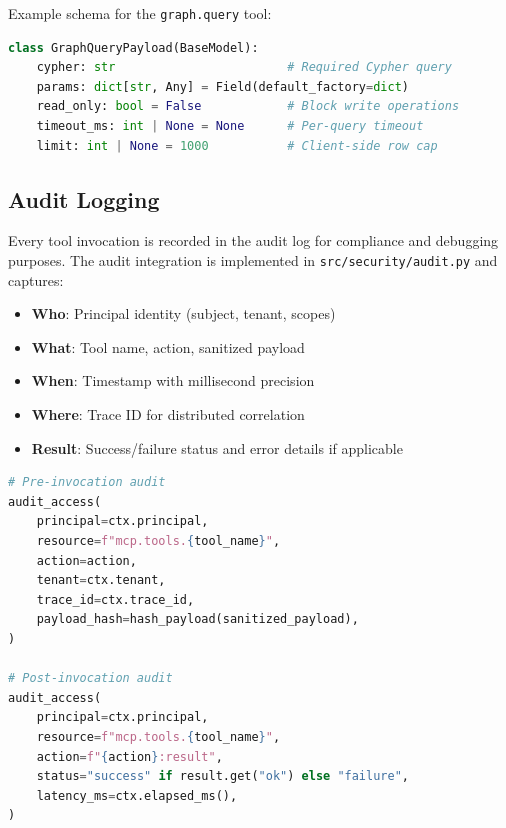Example schema for the \texttt{graph.query} tool:

\begin{lstlisting}[language=Python, caption={Example payload schema for graph.query}, label={lst:graph-query-schema}]
class GraphQueryPayload(BaseModel):
    cypher: str                        # Required Cypher query
    params: dict[str, Any] = Field(default_factory=dict)
    read_only: bool = False            # Block write operations
    timeout_ms: int | None = None      # Per-query timeout
    limit: int | None = 1000           # Client-side row cap
\end{lstlisting}

\subsection{Audit Logging}
\label{subsec:mcp-audit-logging}

Every tool invocation is recorded in the audit log for compliance and debugging purposes. The audit integration is implemented in \texttt{src/security/audit.py} and captures:

\begin{itemize}
    \item \textbf{Who}: Principal identity (subject, tenant, scopes)
    \item \textbf{What}: Tool name, action, sanitized payload
    \item \textbf{When}: Timestamp with millisecond precision
    \item \textbf{Where}: Trace ID for distributed correlation
    \item \textbf{Result}: Success/failure status and error details if applicable
\end{itemize}

\begin{lstlisting}[language=Python, caption={Audit logging integration in the decorator}, label={lst:audit-integration}]
# Pre-invocation audit
audit_access(
    principal=ctx.principal,
    resource=f"mcp.tools.{tool_name}",
    action=action,
    tenant=ctx.tenant,
    trace_id=ctx.trace_id,
    payload_hash=hash_payload(sanitized_payload),
)

# Post-invocation audit
audit_access(
    principal=ctx.principal,
    resource=f"mcp.tools.{tool_name}",
    action=f"{action}:result",
    status="success" if result.get("ok") else "failure",
    latency_ms=ctx.elapsed_ms(),
)
\end{lstlisting}


